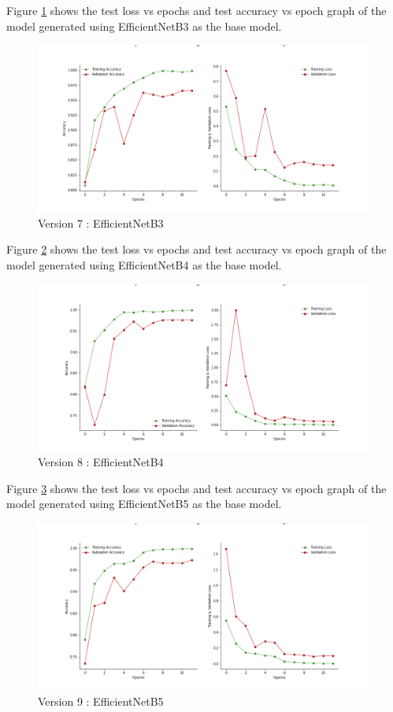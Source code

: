 Figure \ref{fig:effnetb3} shows the test loss vs epochs and test accuracy vs epoch graph of the model generated using EfficientNetB3 as the base model.
\begin{figure}[H]
\includegraphics[scale=0.29]{Photos/EfficientNetB3_plot.png}
\caption{Version 7 : EfficientNetB3} \label{fig:effnetb3}
\end{figure}
Figure \ref{fig:effnetb4} shows the test loss vs epochs and test accuracy vs epoch graph of the model generated using EfficientNetB4 as the base model.
\begin{figure}[H]
\includegraphics[scale=0.29]{Photos/EfficientNetB4_plot.png}
\caption{Version 8 : EfficientNetB4} \label{fig:effnetb4}
\end{figure}
Figure \ref{fig:effnetb5} shows the test loss vs epochs and test accuracy vs epoch graph of the model generated using EfficientNetB5 as the base model.
\begin{figure}[H]
\includegraphics[scale=0.29]{Photos/EfficientNetB5_plot.png}
\caption{Version 9 : EfficientNetB5} \label{fig:effnetb5}
\end{figure}

